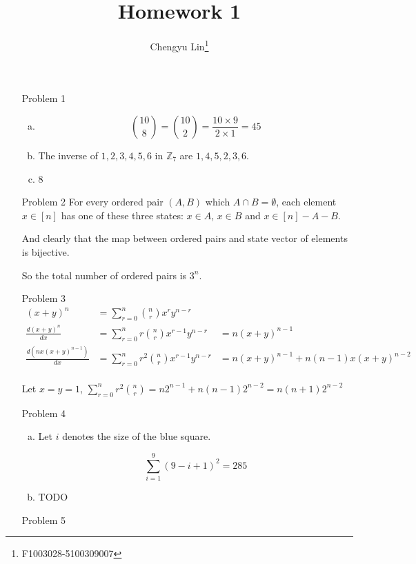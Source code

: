 \documentclass{article}
\title{Homework 1}
\author{Chengyu Lin\footnote{F1003028-5100309007}}
\date{}
\begin{document}
\maketitle

\begin{itemize}
    \item[Problem 1]
        \begin{enumerate}[(a)]
            \item
                $${10\choose8} = {10\choose2} = \frac{10 \times 9}{2 \times 1} = 45$$
            \item
                The inverse of $1, 2, 3, 4, 5, 6$ in $\mathbb{Z}_7$ are
                $1, 4, 5, 2, 3, 6$.
            \item
                8
        \end{enumerate}
    \item[Problem 2]
        For every ordered pair $(A, B)$ which $A \cap B = \emptyset$, 
        each element $x \in [n]$ has one of these
        three states: $x \in A$, $x \in B$ and $x \in [n] - A - B$.

        And clearly that the map between ordered pairs and state vector
        of elements is bijective.

        So the total number of ordered pairs is $3^n$.

    \item[Problem 3]
        \begin{align*}
            (x + y)^n &= \sum_{r=0}^{n} {n \choose r}x^r y^{n-r} \\
            \frac{d(x + y)^n}{dx} &= \sum_{r=0}^{n} r {n \choose r}x^{r-1} y^{n-r} &= n(x + y)^{n-1} \\
            \frac{d(nx(x+y)^{n-1})}{dx} &= \sum_{r=0}^{n} r^2 {n \choose r} x^{r-1} y^{n-r} &= n(x+y)^{n-1} + n(n-1)x(x + y)^{n-2} \\
        \end{align*}

        Let $x = y = 1$, $\sum_{r=0}^{n} r^2 {n \choose r} = n2^{n-1} + n(n-1)2^{n-2} = n(n + 1)2^{n-2}$

    \item[Problem 4]
        \begin{enumerate}[(a)]
            \item
                Let $i$ denotes the size of the blue square.

                $$\sum_{i=1}^{9} (9 - i + 1)^2 = 285$$
            \item
                TODO
        \end{enumerate}

    \item[Problem 5]

\end{itemize}
\end{document}
